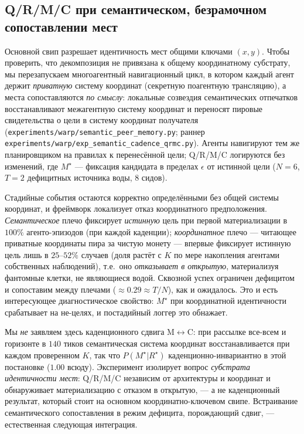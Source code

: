 \documentclass{article}
\newcommand{\method}[1]{\texttt{#1}}
\begin{document}
\subsection{Q/R/M/C при семантическом, безрамочном сопоставлении мест}
\label{p1:app:semantic-matching}

Основной свип разрешает идентичность мест общими ключами $(x,y)$. Чтобы проверить, что
декомпозиция не привязана к общему координатному субстрату, мы перезапускаем
многоагентный навигационный цикл, в котором каждый агент держит \emph{приватную}
систему координат (секретную поагентную трансляцию), а места сопоставляются
\emph{по смыслу}: локальные созвездия семантических отпечатков восстанавливают
межагентную систему координат и переносят пировые свидетельства о цели в систему координат
получателя (\method{experiments/warp/semantic\_peer\_memory.py}; раннер
\method{experiments/warp/exp\_semantic\_cadence\_qrmc.py}). Агенты навигируют
тем же планировщиком на правилах к перенесённой цели; Q/R/M/C логируются
без изменений, где $M^\star$ --- фиксация кандидата в пределах $\epsilon$ от истинной
цели ($N{=}6$, $T{=}2$ дефицитных источника воды, $8$ сидов).

Стадийные события остаются корректно определёнными без общей системы координат, и фреймворк
локализует отказ координатного предположения. \emph{Семантическое} плечо фиксирует
\emph{истинную} цель при первой материализации в $100\%$ агенто-эпизодов (при
каждой каденции); \emph{координатное} плечо --- читающее приватные
координаты пира за чистую монету --- впервые фиксирует истинную цель лишь в $25$--$52\%$
случаев (доля растёт с $K$ по мере накопления агентами собственных наблюдений), т.е.\ оно
\emph{отказывает в открытую}, материализуя фантомные клетки, не являющиеся водой. Сквозной
успех ограничен дефицитом и сопоставим между плечами ($\approx0.29\!\approx\!T/N$),
как и ожидалось. Это и есть интересующее диагностическое свойство: $M^\star$ при
координатной идентичности срабатывает на не-целях, и постадийный логгер это обнажает.

Мы \emph{не} заявляем здесь каденционного сдвига M$\leftrightarrow$C: при
рассылке все-всем и горизонте в $140$ тиков семантическая система координат восстанавливается при
каждом проверенном $K$, так что $P(M^\star|R^\star)$ каденционно-инвариантно в этой постановке
($1.00$ всюду). Эксперимент изолирует вопрос \emph{субстрата идентичности мест}:
Q/R/M/C независим от архитектуры и координат и обнаруживает
материализацию с отказом в открытую, --- а не каденционный результат, который стоит на
основном координатно-ключевом свипе. Встраивание семантического сопоставления в режим
дефицита, порождающий сдвиг, --- естественная следующая интеграция.
\end{document}

